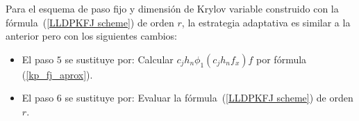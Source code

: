Para el esquema de paso fijo y dimensi\'on de Krylov variable construido con la
f\'ormula~(\ref{LLDPKFJ scheme}) de orden $r$, la estrategia adaptativa es 
similar a la anterior pero con los siguientes cambios: \
\begin{itemize}
    \item El paso $5$ se sustituye por: Calcular $c_jh_n\phi_1(c_jh_nf_x)f$ por f\'ormula (\ref{kp_fj_aprox}).
    \item El paso $6$ se sustituye por: Evaluar la f\'ormula~(\ref{LLDPKFJ scheme}) de orden $r$.
\end{itemize}

